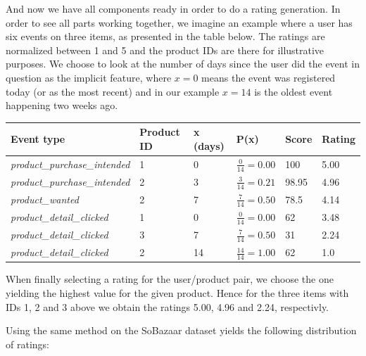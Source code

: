 And now we have all components ready in order to do a rating generation. In
order to see all parts working together, we imagine an example where a user has
six events on three items, as presented in the table below. The ratings are
normalized between 1 and 5 and the product IDs are there for illustrative
purposes. We choose to look at the number of days since the user did the event
in question as the implicit feature, where $x=0$ means the event was registered
today (or as the most recent) and in our example $x=14$ is the oldest event
happening two weeks ago. 

\begin{table}[H]
  \centering
  \begin{tabular}{llllll}
  \toprule
  Event type & Product ID & x (days) & P(x) & Score & Rating \\
  \midrule
  \textit{product\_purchase\_intended}  & 1 & 0   & $\frac{0}{14} = 0.00$  & 100 & 5.00 \\[1.5ex]
  \textit{product\_purchase\_intended}  & 2 & 3   & $\frac{3}{14} = 0.21$  & 98.95 & 4.96 \\[1.5ex]
  \textit{product\_wanted}              & 2 & 7   & $\frac{7}{14} = 0.50$  & 78.5 & 4.14 \\[1.5ex]
  \textit{product\_detail\_clicked}     & 1 & 0   & $\frac{0}{14} = 0.00$  & 62 & 3.48 \\[1.5ex]
  \textit{product\_detail\_clicked}     & 3 & 7   & $\frac{7}{14} = 0.50$  & 31 & 2.24 \\[1.5ex]
  \textit{product\_detail\_clicked}     & 2 & 14  & $\frac{14}{14} = 1.00$ & 62 & 1.0  \\
  \bottomrule
  \end{tabular}
\end{table}

When finally selecting a rating for the user/product pair, we choose the
one yielding the highest value for the given product. Hence for the three items
with IDs 1, 2 and 3 above we obtain the ratings 5.00, 4.96 and 2.24, respectivly.

Using the same method on the SoBazaar dataset yields the following distribution
of ratings:

